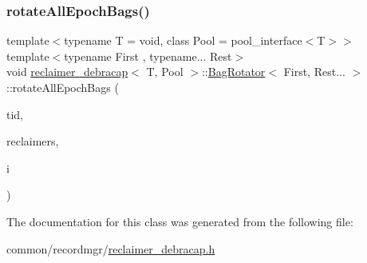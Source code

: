 \subsubsection{\texorpdfstring{rotate\+All\+Epoch\+Bags()}{rotateAllEpochBags()}}
{\footnotesize\ttfamily template$<$typename T  = void, class Pool  = pool\+\_\+interface$<$\+T$>$$>$ \\
template$<$typename First , typename... Rest$>$ \\
void \hyperlink{classreclaimer__debracap}{reclaimer\+\_\+debracap}$<$ T, Pool $>$\+::\hyperlink{classreclaimer__debracap_1_1BagRotator}{Bag\+Rotator}$<$ First, Rest... $>$\+::rotate\+All\+Epoch\+Bags (\begin{DoxyParamCaption}\item[{const int}]{tid,  }\item[{void $\ast$const $\ast$const}]{reclaimers,  }\item[{const int}]{i }\end{DoxyParamCaption})\hspace{0.3cm}{\ttfamily [inline]}}



The documentation for this class was generated from the following file\+:\begin{DoxyCompactItemize}
\item 
common/recordmgr/\hyperlink{reclaimer__debracap_8h}{reclaimer\+\_\+debracap.\+h}\end{DoxyCompactItemize}
